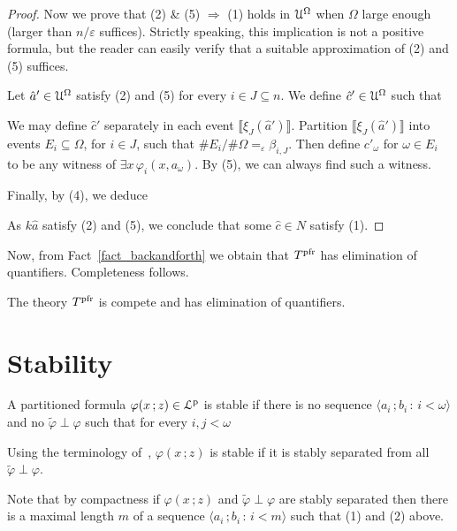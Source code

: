 \documentclass[10pt,oneside]{amsproc}
\begin{document}
\begin{proof}
  Now we prove that (2) \& (5) $\Rightarrow$ (1) holds in ${\EuScript U}^\Omega$ when $\Omega$ large enough (larger than $n/\varepsilon$ suffices).
  Strictly speaking, this implication is not a positive formula, but the reader can easily verify that a suitable approximation of (2) and (5) suffices. 
  
  Let $\hat a'\in{\EuScript U}^\Omega$ satisfy (2) and (5) for every $i\in J\subseteq n$. 
  We define $\hat c'\in{\EuScript U}^\Omega$ such that 
  
  
  We may define $\hat c'$ separately in each event $\llbracket\xi_J(\hat a')\rrbracket$.
  Partition $\llbracket\xi_J(\hat a')\rrbracket$ into events $E_i\subseteq\Omega$, for $i\in J$, such that $\# E_i/\#\Omega=_\varepsilon\beta_{i,J}$.
  Then define $c'_\omega$ for $\omega\in E_i$ to be any witness of $\exists x\,\varphi_i(x,a_\omega)$.
  By (5), we can always find such a witness.
  
  Finally, by (4), we deduce


  As $k\hat a$ satisfy (2) and (5), we conclude that some $\hat c\in N$ satisfy (1).
\end{proof}

Now, from Fact~\ref{fact_backandforth} we obtain that $T^{\rm pfr}$ has elimination of quantifiers.
Completeness follows.

\begin{corollary}
  The theory  $T^{\rm pfr}$ is compete and has elimination of quantifiers.
\end{corollary}

\section{Stability}

A partitioned formula $\varphi(x\,;z)\in{\EuScript L}^{\rm p}$ is stable if there is no sequence $\langle a_i\,;b_i\,:\,i<\omega\rangle$ and no $\tilde\varphi\perp\varphi$ such that for every $i,j<\omega$



Using the terminology of~\cite{Hr}, $\varphi(x\,;z)$ is stable if it is stably separated from all $\tilde\varphi\perp\varphi$.

Note that by compactness if $\varphi(x\,;z)$ and $\tilde\varphi\perp\varphi$ are stably separated then there is a maximal length $m$ of a sequence $\langle a_i\,;b_i\,:\,i<m\rangle$ such that (1) and (2) above.
\end{document}
